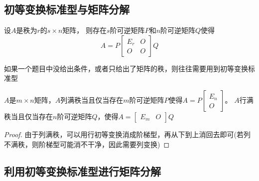 \subsection{初等变换标准型与矩阵分解}

\begin{theorem}[初等变换标准型]
  设$A$是秩为$r$的$s \times n$矩阵，
  则存在$s$阶可逆矩阵$P$和$n$阶可逆矩阵$Q$使得
  \begin{equation*}
    A = P \left[
      \begin{array}{cc}
        E_r&O\\
        O&O
      \end{array}
    \right]Q
  \end{equation*}
\end{theorem}

\begin{note}
  如果一个题目中没给出条件，或者只给出了矩阵的秩，则往往需要用到初等变换标准型
\end{note}

\begin{theorem}[行列满秩的标准型]
  $A$是$m \times n$矩阵，$A$列满秩当且仅当存在$m$阶可逆矩阵$P$使得$A = P \left[
    \begin{array}{c}
      E_n\\
      O
    \end{array}
  \right]$。
  $A$行满秩当且仅当存在$n$阶可逆矩阵$Q$，使得$A = \left[
    \begin{array}{cc}
      E_m&O
    \end{array}
  \right]Q$
\end{theorem}

\begin{proof}
  由于列满秩，可以用行初等变换消成阶梯型，再从下到上消回去即可(若列不满秩，则阶梯型可能消不干净，因此需要列变换)
\end{proof}

\subsection{利用初等变换标准型进行矩阵分解}

